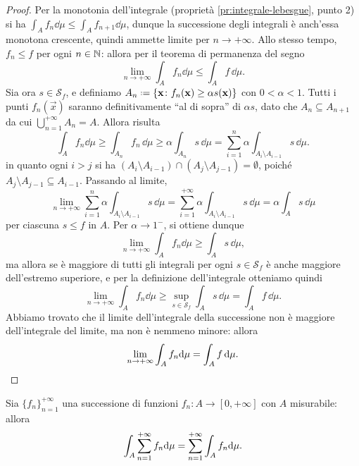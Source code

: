 \begin{proof}
	Per la monotonia dell'integrale (proprietà \ref{pr:integrale-lebesgue}, punto 2) si ha $\int_Af_n\dd\mu\leq\int_Af_{n+1}\dd\mu$, dunque la successione degli integrali è anch'essa monotona crescente, quindi ammette limite per $n\to+\infty$.
	Allo stesso tempo, $f_n\leq f$ per ogni $n\in\mathbb{N}$: allora per il teorema di permanenza del segno
	\begin{equation*}
		\lim_{n\to+\infty}\int_Af_n\dd\mu\leq\int_Af\,\dd\mu.
	\end{equation*}
	Sia ora $s\in\mathcal S_f$, e definiamo $A_n\defeq\{\vec x\colon f_n(\vec x)\geq \alpha s(\vec x)\}$ con $0<\alpha<1$.
	Tutti i punti $f_n(\vec x)$ saranno definitivamente ``al di sopra'' di $\alpha s$, dato che $A_n\subseteq A_{n+1}$ da cui $\bigcup_{n=1}^{+\infty}A_n=A$.
	Allora risulta
	\begin{equation}
		\int_Af_n\dd\mu\geq\int_{A_n}f_n\,\dd\mu\geq\alpha\int_{A_n}s\,\dd\mu=\sum_{i=1}^n\alpha\int_{A_i\setminus A_{i-1}}s\,\dd\mu.	
	\end{equation}
	in quanto ogni $i>j$ si ha $(A_i\setminus A_{i-1})\cap(A_j\setminus A_{j-1})=\emptyset$, poich\'e $A_j\setminus A_{j-1}\subseteq A_{i-1}$. Passando al limite,
	\begin{equation}
		\lim_{n\to+\infty}\sum_{i=1}^n\alpha\int_{A_i\setminus A_{i-1}}s\,\dd\mu=\sum_{i=1}^{+\infty}\alpha\int_{A_i\setminus A_{i-1}}s\,\dd\mu=\alpha\int_As\,\dd\mu
	\end{equation}
	per ciascuna $s\leq f$ in $A$.
	Per $\alpha\to 1^-$, si ottiene dunque
	\begin{equation}
		\lim_{n\to+\infty}\int_Af_n\dd\mu\geq\int_As\,\dd\mu,
	\end{equation}
	ma allora se è maggiore di tutti gli integrali per ogni $s\in\mathcal S_f$ è anche maggiore dell'estremo superiore, e per la definizione dell'integrale otteniamo quindi
	\begin{equation}
		\lim_{n\to+\infty}\int_Af_n\dd\mu\geq\sup_{s\in\mathcal S_f}\int_As\,\dd\mu=\int_Af\,\dd\mu.
	\end{equation}
	Abbiamo trovato che il limite dell'integrale della successione non è maggiore dell'integrale del limite, ma non è nemmeno minore: allora
	\begin{equation}
		\lim_{n\to+\infty}\int_Af_n\textup{d}\mu=\int_Af\,\textup{d}\mu.\qedhere
	\end{equation}
\end{proof}
\begin{corollario} \label{cor:serie-integrali}
	Sia $\{f_n\}_{n=1}^{+\infty}$ una successione di funzioni $f_n\colon A\to[0,+\infty]$ con $A$ misurabile: allora
	\begin{equation}
		\int_A\sum_{{n}=1}^{+\infty}f_n\textup{d}\mu=\sum_{{n}=1}^{+\infty}\int_Af_n\textup{d}\mu.
		\label{eq:serie-integrali}
	\end{equation}
\end{corollario}
